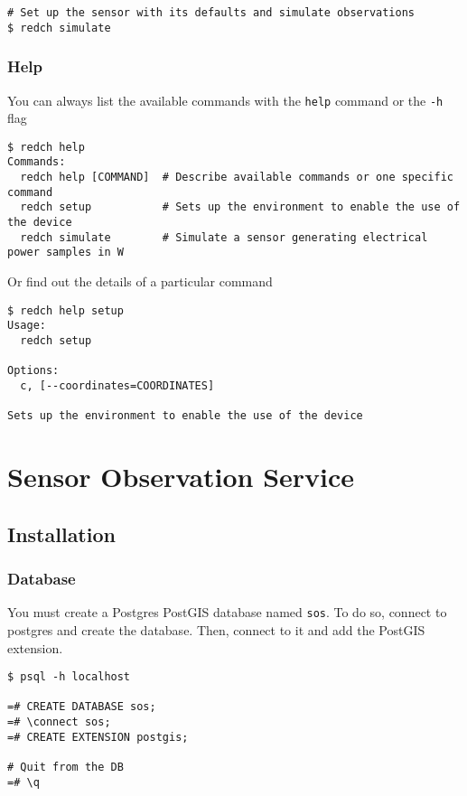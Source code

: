 \begin{verbatim}
# Set up the sensor with its defaults and simulate observations
$ redch simulate
\end{verbatim}

\subsubsection*{Help}\label{help}

You can always list the available commands with the \texttt{help}
command or the \texttt{-h} flag

\begin{verbatim}
$ redch help
Commands:
  redch help [COMMAND]  # Describe available commands or one specific command
  redch setup           # Sets up the environment to enable the use of the device
  redch simulate        # Simulate a sensor generating electrical power samples in W
\end{verbatim}

Or find out the details of a particular command

\begin{verbatim}
$ redch help setup
Usage:
  redch setup

Options:
  c, [--coordinates=COORDINATES]

Sets up the environment to enable the use of the device
\end{verbatim}


\section{Sensor Observation Service}\label{doc-sos}

\subsection*{Installation}\label{installation}

\subsubsection*{Database}\label{database}

You must create a Postgres PostGIS database named \texttt{sos}. To do
so, connect to postgres and create the database. Then, connect to it and
add the PostGIS extension.

\begin{verbatim}
$ psql -h localhost

=# CREATE DATABASE sos;
=# \connect sos;
=# CREATE EXTENSION postgis;

# Quit from the DB
=# \q
\end{verbatim}

